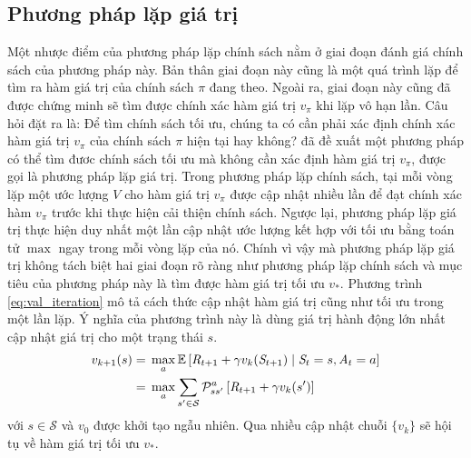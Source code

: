 \subsection{Phương pháp lặp giá trị}
Một nhược điểm của phương pháp lặp chính sách nằm ở giai đoạn đánh giá chính sách của phương pháp này. Bản thân giai đoạn này cũng là một quá trình lặp để tìm ra hàm giá trị của chính sách $\pi$ đang theo. Ngoài ra, giai đoạn này cũng đã được chứng minh sẽ tìm được chính xác hàm giá trị $v_{\pi}$ khi lặp vô hạn lần. Câu hỏi đặt ra là: Để tìm chính sách tối ưu, chúng ta có cần phải xác định chính xác hàm giá trị $v_{\pi}$ của chính sách $\pi$ hiện tại hay không? \cite{smallwood1973optimal} đã đề xuất một phương pháp có thể tìm đươc chính sách tối ưu mà không cần xác định hàm giá trị $v_{\pi}$, được gọi là phương pháp lặp giá trị. Trong phương pháp lặp chính sách, tại mỗi vòng lặp một ước lượng $V$ cho hàm giá trị $v_{\pi}$ được cập nhật nhiều lần để đạt chính xác hàm $v_{\pi}$ trước khi thực hiện cải thiện chính sách. Ngược lại, phương pháp lặp giá trị thực hiện duy nhất một lần cập nhật ước lượng kết hợp với tối ưu bằng toán tử $\max$ ngay trong mỗi vòng lặp của nó. Chính vì vậy mà phương pháp lặp giá trị không tách biệt hai giai đoạn rõ ràng như phương pháp lặp chính sách và mục tiêu của phương pháp này là tìm được hàm giá trị tối ưu $v_*$. Phương trình \ref{eq:val_iteration} mô tả cách thức cập nhật hàm giá trị cũng như tối ưu trong một lần lặp. Ý nghĩa của phương trình này là dùng giá trị hành động lớn nhất cập nhật giá trị cho một trạng thái $s$.
\begin{align}
	v_{k+1}(s) = {} & \max_{a}\mathbb{E}\left[\mathit{R}_{t+1} + \gamma v_{k}(\mathit{S}_{t+1}) \mid \mathit{S}_{t} = s, \mathit{A}_t = a\right] \notag \\
	= {} & \max_{a}\sum_{s' \in \mathcal{S}}\mathcal{P}_{ss'}^{a}\left[\mathit{R}_{t+1} + \gamma v_{k}(s')\right] \label{eq:val_iteration}
\end{align}
với $s \in \mathcal{S}$ và $v_{0}$ được khởi tạo ngẫu nhiên. Qua nhiều cập nhật chuỗi $\{v_{k}\}$ sẽ hội tụ về hàm giá trị tối ưu $v_*$.

